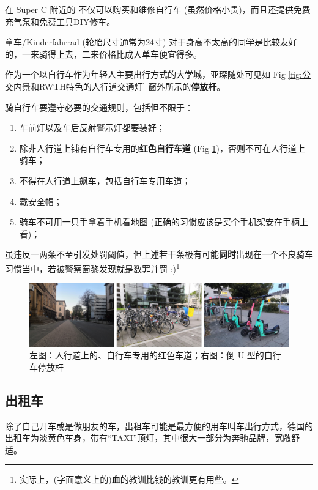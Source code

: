     在 Super C 附近的  不仅可以购买和维修自行车 (虽然价格小贵)，而且还提供免费充气泵和免费工具DIY修车。

    童车/Kinderfahrrad (轮胎尺寸通常为24寸) 对于身高不太高的同学是比较友好的，一来骑得上去，二来价格比成人单车便宜得多。

    作为一个以自行车作为年轻人主要出行方式的大学城，亚琛随处可见如 Fig \ref{fig:公交内景和RWTH特色的人行道交通灯} 窗外所示的\textbf{停放杆}。

    骑自行车要遵守必要的交通规则，包括但不限于：

    \begin{enumerate}
      \item 车前灯以及车后反射警示灯都要装好；
      \item 除非人行道上铺有自行车专用的\textbf{红色自行车道} (Fig \ref{fig:自行车})，否则不可在人行道上骑车；
      \item 不得在人行道上飙车，包括自行车专用车道；
      \item 戴安全帽；
      \item 骑车不可用一只手拿着手机看地图 (正确的习惯应该是买个手机架安在手柄上看)；
    \end{enumerate}

    虽违反一两条不至引发处罚阈值，但上述若干条极有可能\textbf{同时}出现在一个不良骑车习惯当中，若被警察蜀黎发现就是数罪并罚 :)\footnote{实际上，(字面意义上的)\textbf{血}的教训比钱的教训更有用些。}

    \begin{figure}
      \centering
      \includegraphics[width=\textwidth]{在亚琛学习和生活/Verkersmittel/自行车.png}
      \caption{左图：人行道上的、自行车专用的红色车道；右图：倒 U 型的自行车停放杆}
      \label{fig:自行车}
    \end{figure}

  \subsection{出租车}\label{subsec:出租车}

    除了自己开车或是做朋友的车，出租车可能是最方便的用车叫车出行方式，德国的出租车为淡黄色车身，带有``TAXI''顶灯，其中很大一部分为奔驰品牌，宽敞舒适。

